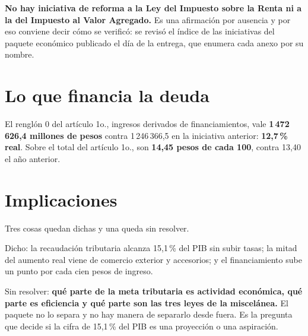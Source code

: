 \textbf{No hay iniciativa de reforma a la Ley del Impuesto sobre la Renta ni a la del
Impuesto al Valor Agregado.} Es una afirmación por ausencia y por eso conviene decir cómo se
verificó: se revisó el índice de las iniciativas del paquete económico publicado el día de la
entrega, que enumera cada anexo por su nombre.

\section{Lo que financia la deuda}

El renglón 0 del artículo 1o., ingresos derivados de financiamientos, vale
\textbf{1\,472\,626,4 millones de pesos} contra 1\,246\,366,5 en la iniciativa anterior:
\textbf{12,7\,\% real}. Sobre el total del artículo 1o., son \textbf{14,45 pesos de cada
100}, contra 13,40 el año anterior.


\section{Implicaciones}

Tres cosas quedan dichas y una queda sin resolver.

Dicho: la recaudación tributaria alcanza 15,1\,\% del PIB sin subir tasas; la mitad del
aumento real viene de comercio exterior y accesorios; y el financiamiento sube un punto por
cada cien pesos de ingreso.

Sin resolver: \textbf{qué parte de la meta tributaria es actividad económica, qué parte es
eficiencia y qué parte son las tres leyes de la miscelánea.} El paquete no lo separa y no hay
manera de separarlo desde fuera. Es la pregunta que decide si la cifra de 15,1\,\% del PIB es
una proyección o una aspiración.

